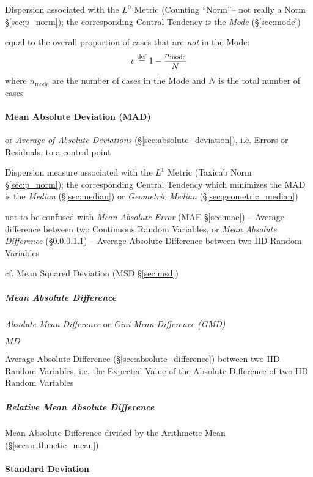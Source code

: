 Dispersion associated with the $L^0$ Metric (Counting ``Norm''-- not really a
Norm \S\ref{sec:p_norm}); the corresponding Central Tendency is the \emph{Mode}
(\S\ref{sec:mode})

equal to the overall proportion of cases that are \emph{not} in the Mode:
\[
  v \stackrel{\mathrm{def}}= 1 - \frac{n_{\text{mode}}}{N}
\]
where $n_{\text{mode}}$ are the number of cases in the Mode and $N$ is the total
number of cases



\paragraph{Mean Absolute Deviation (MAD)}\label{sec:mad}\hfill

or \emph{Average of Absolute Deviations} (\S\ref{sec:absolute_deviation}), i.e.
Errors or Residuals, to a central point

Dispersion measure associated with the $L^1$ Metric (Taxicab Norm
\S\ref{sec:p_norm}); the corresponding Central Tendency which minimizes the MAD
is the \emph{Median} (\S\ref{sec:median}) or \emph{Geometric Median}
(\S\ref{sec:geometric_median})

\fist not to be confused with \emph{Mean Absolute Error} (MAE \S\ref{sec:mae})
-- Average difference between two Continuous Random Variables,
or \emph{Mean Absolute Difference} (\S\ref{sec:mean_absolute_difference}) --
Average Absolute Difference between two IID Random Variables

cf. Mean Squared Deviation (MSD \S\ref{sec:msd})



\subparagraph{Mean Absolute Difference}
\label{sec:mean_absolute_difference}\hfill

\emph{Absolute Mean Difference} or \emph{Gini Mean Difference (GMD)}

$MD$

Average Absolute Difference (\S\ref{sec:absolute_difference}) between two IID
Random Variables, i.e. the Expected Value of the Absolute Difference of two IID
Random Variables



\subparagraph{Relative Mean Absolute Difference}
\label{sec:relative_mean_absolute_difference}\hfill

Mean Absolute Difference divided by the Arithmetic Mean
(\S\ref{sec:arithmetic_mean})



\paragraph{Standard Deviation}\label{sec:standard_deviation}\hfill

